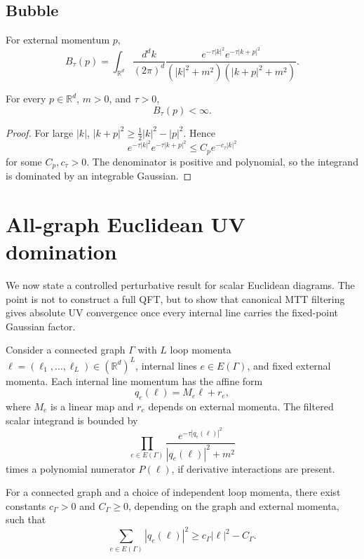 \documentclass[11pt]{article}
\begin{document}
\subsection{Bubble}

For external momentum \(p\),
\[
        B_\tau(p)
        =
        \int_{\mathbb R^d}
        \frac{d^dk}{(2\pi)^d}
        \frac{e^{-\tau |k|^2}e^{-\tau |k+p|^2}}
        {(|k|^2+m^2)(|k+p|^2+m^2)} .
\]

\begin{proposition}
For every \(p\in\mathbb R^d\), \(m>0\), and \(\tau>0\),
\[
        B_\tau(p)<\infty .
\]
\end{proposition}

\begin{proof}
For large \(|k|\), \(|k+p|^2\ge \frac12|k|^2-|p|^2\). Hence
\[
        e^{-\tau |k|^2}e^{-\tau |k+p|^2}
        \le
        C_p e^{-c_\tau |k|^2}
\]
for some \(C_p,c_\tau>0\). The denominator is positive and polynomial, so the integrand is dominated by an integrable Gaussian.
\end{proof}

\section{All-graph Euclidean UV domination}

We now state a controlled perturbative result for scalar Euclidean diagrams. The point is not to construct a full QFT, but to show that canonical MTT filtering gives absolute UV convergence once every internal line carries the fixed-point Gaussian factor.

Consider a connected graph \(\Gamma\) with \(L\) loop momenta \(\ell=(\ell_1,\dots,\ell_L)\in(\mathbb R^d)^L\), internal lines \(e\in E(\Gamma)\), and fixed external momenta. Each internal line momentum has the affine form
\[
        q_e(\ell)=M_e\ell+r_e,
\]
where \(M_e\) is a linear map and \(r_e\) depends on external momenta. The filtered scalar integrand is bounded by
\[
        \prod_{e\in E(\Gamma)}
        \frac{e^{-\tau |q_e(\ell)|^2}}
        {|q_e(\ell)|^2+m^2}
\]
times a polynomial numerator \(P(\ell)\), if derivative interactions are present.

\begin{lemma}
For a connected graph and a choice of independent loop momenta, there exist constants \(c_\Gamma>0\) and \(C_\Gamma\ge0\), depending on the graph and external momenta, such that
\[
        \sum_{e\in E(\Gamma)} |q_e(\ell)|^2
        \ge
        c_\Gamma |\ell|^2-C_\Gamma .
\]
\end{lemma}
\end{document}
